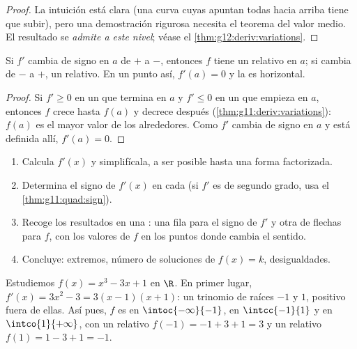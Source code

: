 \begin{proof}
La intuición está clara (una curva cuyas  apuntan todas hacia
arriba tiene que subir), pero una demostración rigurosa necesita el
teorema del valor medio. El resultado se \emph{admite a este nivel};
véase el \cref{thm:g12:deriv:variations}.
\end{proof}

\begin{proposition}[Extremos]\label{prop:g11:deriv:extrema}
Si $f'$ cambia de signo en $a$ de $+$ a $-$, entonces $f$ tiene un 
relativo en $a$; si cambia de $-$ a $+$, un  relativo. En un punto
así, $f'(a) = 0$ y la  es horizontal.
\end{proposition}

\begin{proof}
Si $f' \geq 0$ en un  que termina en $a$ y $f' \leq 0$ en un
 que empieza en $a$, entonces $f$ crece hasta $f(a)$ y decrece
después (\cref{thm:g11:deriv:variations}): $f(a)$ es el mayor valor de los
alrededores. Como $f'$ cambia de signo en $a$ y está definida allí,
$f'(a) = 0$.
\end{proof}

\begin{method}\label{met:g11:deriv:study}
\begin{enumerate}
  \item Calcula $f'(x)$ y simplifícala, a ser posible hasta una forma
        factorizada.
  \item Determina el signo de $f'(x)$ en cada  (si $f'$ es de
        segundo grado, usa el \cref{thm:g11:quad:sign}).
  \item Recoge los resultados en una \emph{}: una fila
        para el signo de $f'$ y otra de flechas para $f$, con los valores
        de $f$ en los puntos donde cambia el sentido.
  \item Concluye: extremos, número de soluciones de $f(x) = k$,
        desigualdades.
\end{enumerate}
\end{method}

\begin{example}\label{ex:g11:deriv:study}
Estudiemos $f(x) = x^3 - 3x + 1$ en $\R$. En primer lugar,
$f'(x) = 3x^2 - 3 = 3(x-1)(x+1)$: un trinomio de raíces $-1$ y $1$,
positivo fuera de ellas. Así pues, $f$ es  en
$\intoc{-\infty}{-1}$,  en $\intcc{-1}{1}$ y  en
$\intco{1}{+\infty}$, con un  relativo $f(-1) = -1 + 3 + 1 = 3$ y un
 relativo $f(1) = 1 - 3 + 1 = -1$.
\end{example}

